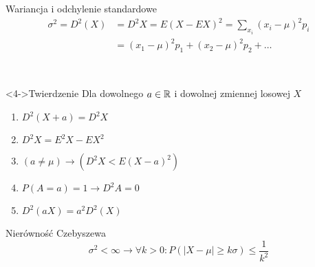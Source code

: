 \documentclass{mp}
\begin{document}
\begin{frame}{Wariancja i odchylenie standardowe}
\begin{align*}
 \sigma^2=D^2(X)&=D^2X=E(X-EX)^2 =\sum_{x_i}(x_i-\mu)^2p_i \\ & =
 (x_1-\mu)^2p_1+(x_2-\mu)^2p_2+\ldots
\end{align*}
{
	\begin{center}
	     \\
	\only<3->{\dice{1} \dice{2} \dice{3} \dice{6} \dice{6} \dice{6}}
	\end{center}
}
\begin{block}<4->{Twierdzenie}
	Dla dowolnego $a\in\mathbb{R}$ i dowolnej zmiennej losowej $X$
\begin{enumerate}
\item<4-> $D^2(X+a)=D^2X $
\item<5-> $D^2X=E^2X-EX^2 $
\item<6-> $(a\neq \mu)\to (D^2X<E(X-a)^2) $
\item<7-> $P(A=a)=1 \to D^2A=0 $
\item<8-> $D^2(aX)=a^2D^2(X) $
\end{enumerate}
\end{block}
\end{frame}
\begin{frame}{Nierówność Czebyszewa}
\[\sigma^2<\infty \to \forall k>0\colon P(\left|X-\mu\right|\geq k\sigma)\leq \frac{1}{k^2} \]
\end{frame}
\end{document}
